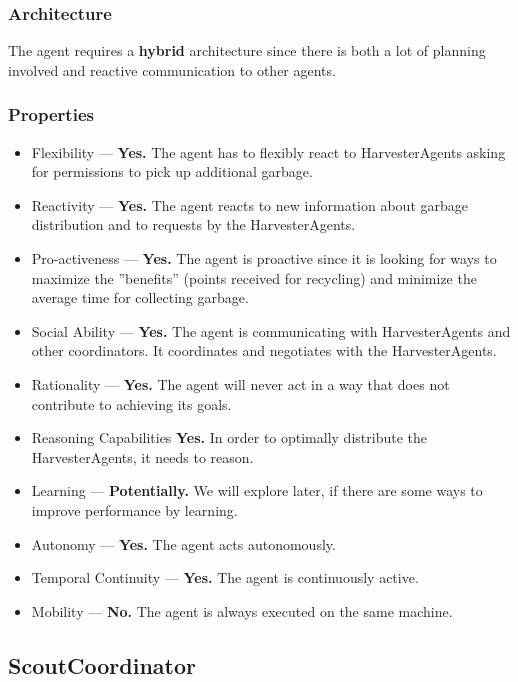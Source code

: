 \subsubsection*{Architecture}

The agent requires a \textbf{hybrid} architecture since there is both a lot of planning involved and reactive communication to other agents.

\subsubsection*{Properties}

\begin{itemize}
	\item Flexibility — \textbf{Yes.} The agent has to flexibly react to HarvesterAgents asking for permissions to pick up additional garbage.
	\item Reactivity — \textbf{Yes.} The agent reacts to new information about garbage distribution and to requests by the HarvesterAgents.
	\item Pro-activeness — \textbf{Yes.} The agent is proactive since it is looking for ways to maximize the ''benefits'' (points received for recycling) and minimize the average time for collecting garbage.
	\item Social Ability — \textbf{Yes.} The agent is communicating with HarvesterAgents and other coordinators. It coordinates and negotiates with the HarvesterAgents.
	\item Rationality — \textbf{Yes.} The agent will never act in a way that does not contribute to achieving its goals.
	\item Reasoning Capabilities \textbf{Yes.} In order to optimally distribute the HarvesterAgents, it needs to reason.
	\item Learning — \textbf{Potentially.} We will explore later, if there are some ways to improve performance by learning.
	\item Autonomy — \textbf{Yes.} The agent acts autonomously.
	\item Temporal Continuity — \textbf{Yes.} The agent is continuously active.
	\item Mobility — \textbf{No.} The agent is always executed on the same machine.
\end{itemize}

\subsection{ScoutCoordinator}

